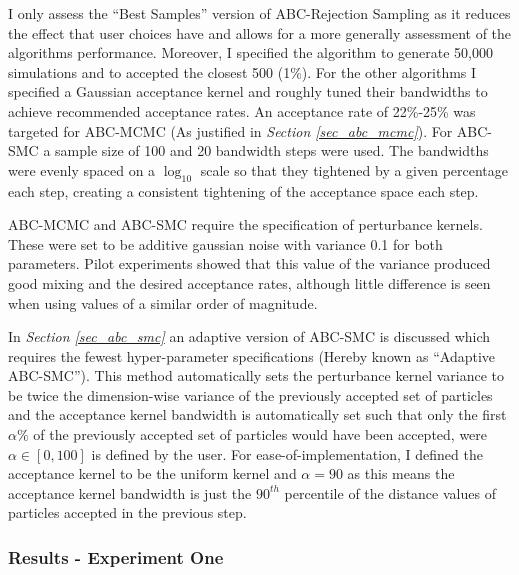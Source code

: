 \documentclass[11pt,a4paper]{article}
\theoremstyle{break}
\begin{document}
  \par I only assess the ``Best Samples'' version of ABC-Rejection Sampling as it reduces the effect that user choices have and allows for a more generally assessment of the algorithms performance. Moreover, I specified the algorithm to generate 50,000 simulations and to accepted the closest 500 (1\%). For the other algorithms I specified a Gaussian acceptance kernel and roughly tuned their bandwidths to achieve recommended acceptance rates. An acceptance rate of 22\%-25\% was targeted for ABC-MCMC (As justified in \textit{Section \ref{sec_abc_mcmc}}). For ABC-SMC a sample size of 100 and 20 bandwidth steps were used. The bandwidths were evenly spaced on a $\log_10$ scale so that they tightened by a given percentage each step, creating a consistent tightening of the acceptance space each step.

  \par ABC-MCMC and ABC-SMC require the specification of perturbance kernels. These were set to be additive gaussian noise with variance 0.1 for both parameters. Pilot experiments showed that this value of the variance produced good mixing and the desired acceptance rates, although little difference is seen when using values of a similar order of magnitude.

  \par In \textit{Section \ref{sec_abc_smc}} an adaptive version of ABC-SMC is discussed which requires the fewest hyper-parameter specifications (Hereby known as ``Adaptive ABC-SMC''). This method automatically sets the perturbance kernel variance to be twice the dimension-wise variance of the previously accepted set of particles and the acceptance kernel bandwidth is automatically set such that only the first $\alpha\%$ of the previously accepted set of particles would have been accepted, were $\alpha\in[0,100]$ is defined by the user. For ease-of-implementation, I defined the acceptance kernel to be the uniform kernel and $\alpha=90$ as this means the acceptance kernel bandwidth is just the $90^{th}$ percentile of the distance values of particles accepted in the previous step.

\subsubsection*{Results - Experiment One}
\end{document}
